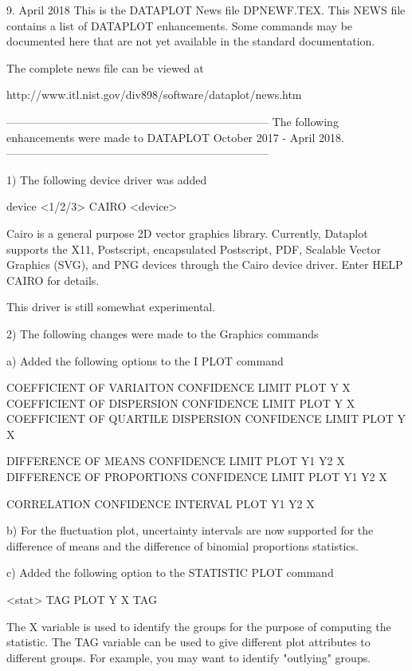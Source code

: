 9.
                                                       April  2018
This is the DATAPLOT News file DPNEWF.TEX.  This NEWS file contains a
list of DATAPLOT enhancements.  Some commands may be documented here
that are not yet available in the standard documentation.

The complete news file can be viewed at

    http://www.itl.nist.gov/div898/software/dataplot/news.htm

-----------------------------------------------------------------------
The following enhancements were made to DATAPLOT
October 2017 - April 2018.
-----------------------------------------------------------------------

 1) The following device driver was added

        device <1/2/3> CAIRO <device>

    Cairo is a general purpose 2D vector graphics library.  Currently,
    Dataplot supports the X11, Postscript, encapsulated Postscript,
    PDF, Scalable Vector Graphics (SVG), and PNG devices through
    the Cairo device driver.  Enter HELP CAIRO for details.

    This driver is still somewhat experimental.

 2) The following changes were made to the Graphics commands

    a) Added the following options to the I PLOT command

         COEFFICIENT OF VARIAITON CONFIDENCE LIMIT PLOT Y X
         COEFFICIENT OF DISPERSION CONFIDENCE LIMIT PLOT Y X
         COEFFICIENT OF QUARTILE DISPERSION CONFIDENCE LIMIT PLOT Y X

         DIFFERENCE OF MEANS CONFIDENCE LIMIT PLOT Y1 Y2 X
         DIFFERENCE OF PROPORTIONS CONFIDENCE LIMIT PLOT Y1 Y2 X

         CORRELATION CONFIDENCE INTERVAL PLOT Y1 Y2 X

    b) For the fluctuation plot, uncertainty intervals are now
       supported for the difference of means and the difference
       of binomial proportions statistics.

    c) Added the following option to the STATISTIC PLOT command

          <stat> TAG PLOT Y X TAG

       The X variable is used to identify the groups for the
       purpose of computing the statistic.  The TAG variable can
       be used to give different plot attributes to different
       groups.  For example, you may want to identify "outlying"
       groups.

